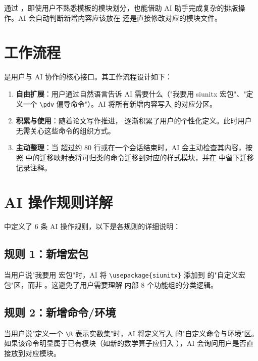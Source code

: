 \documentclass[../main-manual.tex]{subfiles}
\begin{document}
通过 ，即使用户不熟悉模板的模块划分，也能借助 AI 助手完成复杂的排版操作。AI 会自动判断新增内容应该放在  还是直接修改对应的模块文件。

\section{ 工作流程}

 是用户与 AI 协作的核心接口。其工作流程设计如下：

\begin{enumerate}[label=\textbf{阶段\arabic*：}]
	\item \textbf{自由扩展}：用户通过自然语言告诉 AI 需要什么（"我要用 siunitx 宏包"、"定义一个 \verb|\pdv| 偏导命令"）。AI 将所有新增内容写入  的对应分区。
	\item \textbf{积累与使用}：随着论文写作推进， 逐渐积累了用户的个性化定义。此时用户无需关心这些命令的组织方式。
	\item \textbf{主动整理}：当  超过约 80 行或在一个会话结束时，AI 会主动检查其内容，按照  中的迁移映射表将可归类的命令迁移到对应的样式模块，并在  中留下迁移记录注释。
\end{enumerate}

\section{AI 操作规则详解}

 中定义了 6 条 AI 操作规则，以下是各规则的详细说明：

\subsection{规则 1：新增宏包}

当用户说"我要用  宏包"时，AI 将 \verb|\usepackage{siunitx}| 添加到  的"自定义宏包"区，而非 。这避免了用户需要理解  内部 8 个功能组的分类逻辑。

\subsection{规则 2：新增命令/环境}

当用户说"定义一个 \verb|\R| 表示实数集"时，AI 将定义写入  的"自定义命令与环境"区。如果该命令明显属于已有模块（如新的数学算子应归入 ），AI 会询问用户是否直接放到对应模块。
\end{document}
